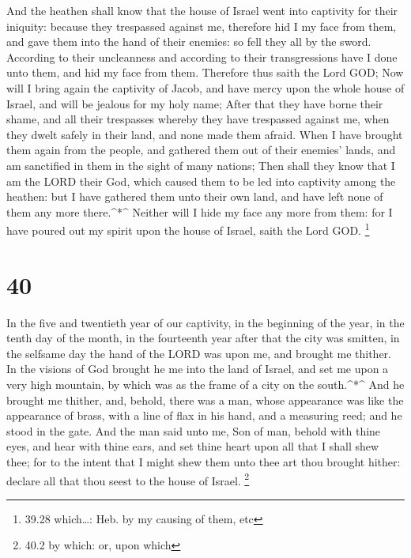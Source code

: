  And the heathen shall know that the house of Israel went
into captivity for their iniquity: because they trespassed against me,
therefore hid I my face from them, and gave them into the hand of their
enemies: so fell they all by the sword.  According to their
uncleanness and according to their transgressions have I done unto them,
and hid my face from them.  Therefore thus saith the Lord
GOD; Now will I bring again the captivity of Jacob, and have mercy upon
the whole house of Israel, and will be jealous for my holy name;
 After that they have borne their shame, and all their
trespasses whereby they have trespassed against me, when they dwelt
safely in their land, and none made them afraid.  When I
have brought them again from the people, and gathered them out of their
enemies' lands, and am sanctified in them in the sight of many nations;
 Then shall they know that I am the LORD their God, which
caused them to be led into captivity among the heathen: but I have
gathered them unto their own land, and have left none of them any more
there.\^{}*\^{}  Neither will I hide my face any more from
them: for I have poured out my spirit upon the house of Israel, saith
the Lord GOD. \footnote{39.28 which\ldots: Heb. by my causing of them,
  etc}

\hypertarget{section-39}{%
\section{40}\label{section-39}}

 In the five and twentieth year of our captivity, in the
beginning of the year, in the tenth day of the month, in the fourteenth
year after that the city was smitten, in the selfsame day the hand of
the LORD was upon me, and brought me thither.  In the
visions of God brought he me into the land of Israel, and set me upon a
very high mountain, by which was as the frame of a city on the
south.\^{}*\^{}  And he brought me thither, and, behold,
there was a man, whose appearance was like the appearance of brass, with
a line of flax in his hand, and a measuring reed; and he stood in the
gate.  And the man said unto me, Son of man, behold with
thine eyes, and hear with thine ears, and set thine heart upon all that
I shall shew thee; for to the intent that I might shew them unto thee
art thou brought hither: declare all that thou seest to the house of
Israel. \footnote{40.2 by which: or, upon which}

